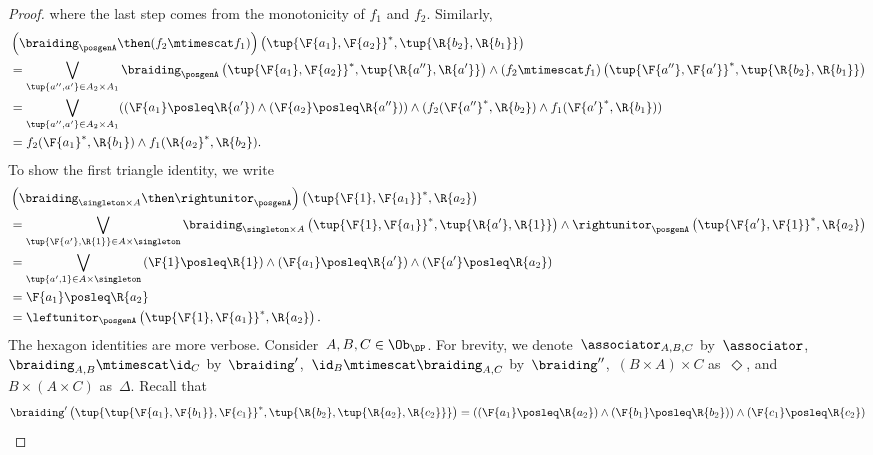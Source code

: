 \begin{proof}
  where the last step comes from the monotonicity of $f_1$ and $f_2$. Similarly,
  \begin{equation}
    \begin{aligned}
      &\left( \braiding_\posgenA \then (f_2\mtimescat f_1)\right)\left( \tup{\F{a_1},\F{a_2}}^*,\tup{\R{b_2},\R{b_1}}\right)\\
      &=\bigvee_{\tup{a'',a'}\in A_2\times A_1}\braiding_\posgenA\left(\tup{\F{a_1},\F{a_2}}^*,\tup{\R{a''},\R{a'}} \right)\wedge \left(f_2\mtimescat f_1\right) \left( \tup{\F{a''},\F{a'}}^*,\tup{\R{b_2},\R{b_1}}\right)\\
      &=\bigvee_{\tup{a'',a'}\in A_2\times A_1}(\left(\F{a_1}\posleq \R{a'}\right)\wedge \left(\F{a_2}\posleq \R{a''}\right)) \wedge (f_2(\F{a''}^*,\R{b_2})\wedge f_1(\F{a'}^*,\R{b_1}))\\
      &= f_2(\F{a_1}^*,\R{b_1}) \wedge f_1(\R{a_2}^*,\R{b_2}).
    \end{aligned}
  \end{equation}
  To show the first triangle identity, we write
  \begin{equation}
    \begin{aligned}
      &\left(\braiding_{\singleton \times A}\then \rightunitor_\posgenA\right)\left( \tup{\F{1},\F{a_1}}^*,\R{a_2}\right)\\
      &=\bigvee_{\tup{\F{a'},\R{1}}\in A\times \singleton}\braiding_{\singleton \times A}\left( \tup{\F{1},\F{a_1}}^*,\tup{\R{a'},\R{1}}\right)\wedge \rightunitor_\posgenA\left( \tup{\F{a'},\F{1}}^*,\R{a_2}\right)\\
      &=\bigvee_{\tup{a',1}\in A\times \singleton} \left(\F{1}\posleq \R{1}\right) \wedge \left(\F{a_1}\posleq \R{a'}\right)\wedge \left(\F{a'}\posleq \R{a_2}\right)\\
      &=\F{a_1}\posleq \R{a_2}\\
      &=\leftunitor_\posgenA\left( \tup{\F{1},\F{a_1}}^*,\R{a_2}\right).
    \end{aligned}
  \end{equation}
  The hexagon identities are more verbose. Consider~$A,B,C\in \Ob_\DP$. For brevity, we denote~$\associator_{A,B,C}$ by~$\associator$,~$\braiding_{A,B}\mtimescat \id_C$ by~$\braiding'$,~$\id_B \mtimescat \braiding_{A,C}$ by~$\braiding''$,~$(B\times A)\times C$ as~$\Diamond$, and~$B\times (A\times C)$ as~$\Delta$. Recall that
  \begin{equation}
    \begin{aligned}
      \braiding' \left(\tup{\tup{\F{a_1},\F{b_1}},\F{c_1}}^*,\tup{\R{b_2},\tup{\R{a_2},\R{c_2}}} \right)&=\left( (\F{a_1}\posleq \R{a_2})  \wedge (\F{b_1}\posleq \R{b_2})\right)\wedge (\F{c_1}\posleq \R{c_2})\\

\end{aligned}
\end{equation}
\end{proof}
